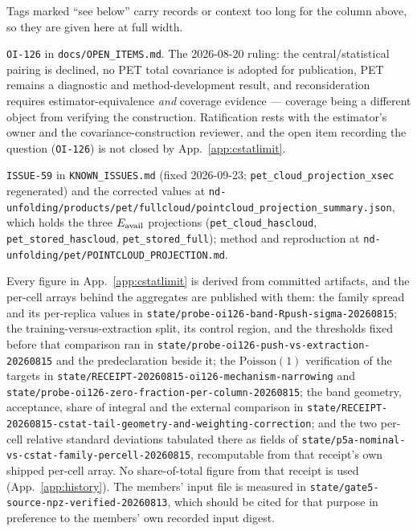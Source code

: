 \noindent Tags marked ``see below'' carry records or context too long for the column above, so they are given here at full width.

\begin{description}[leftmargin=0pt,itemsep=3pt]
  \item[\texttt{pet-pairing}.] \texttt{OI-126} in \texttt{docs/OPEN\_ITEMS.md}. The 2026-08-20 ruling: the central/statistical pairing is declined, no PET total covariance is adopted for publication, PET remains a diagnostic and method-development result, and reconsideration requires estimator-equivalence \emph{and} coverage evidence --- coverage being a different object from verifying the construction. Ratification rests with the estimator's owner and the covariance-construction reviewer, and the open item recording the question (\texttt{OI-126}) is not closed by App.~\ref{app:cstatlimit}.
  \item[\texttt{pet-projection-figure}.] \texttt{ISSUE-59} in \texttt{KNOWN\_ISSUES.md} (fixed 2026-09-23; \texttt{pet\_cloud\_projection\_xsec} regenerated) and the corrected values at \texttt{nd-unfolding/products/pet/fullcloud/pointcloud\_projection\_summary.json}, which holds the three $E_{\mathrm{avail}}$ projections (\texttt{pet\_cloud\_hascloud}, \texttt{pet\_stored\_hascloud}, \texttt{pet\_stored\_full}); method and reproduction at \texttt{nd-unfolding/pet/POINTCLOUD\_PROJECTION.md}.
  \item[\texttt{cstat-recompute}.] Every figure in App.~\ref{app:cstatlimit} is derived from committed artifacts, and the per-cell arrays behind the aggregates are published with them: the family spread and its per-replica values in \texttt{state/probe-oi126-band-Rpush-sigma-20260815}; the training-versus-extraction split, its control region, and the thresholds fixed before that comparison ran in \texttt{state/probe-oi126-push-vs-extraction-20260815} and the predeclaration beside it; the $\mathrm{Poisson}(1)$ verification of the targets in \texttt{state/RECEIPT-20260815-oi126-mechanism-narrowing} and \texttt{state/probe-oi126-zero-fraction-per-column-20260815}; the band geometry, acceptance, share of integral and the external comparison in \texttt{state/RECEIPT-20260815-cstat-tail-geometry-and-weighting-correction}; and the two per-cell relative standard deviations tabulated there as fields of \texttt{state/p5a-nominal-vs-cstat-family-percell-20260815}, recomputable from that receipt's own shipped per-cell array. No share-of-total figure from that receipt is used (App.~\ref{app:history}). The members' input file is measured in \texttt{state/gate5-source-npz-verified-20260813}, which should be cited for that purpose in preference to the members' own recorded input digest.
\end{description}

